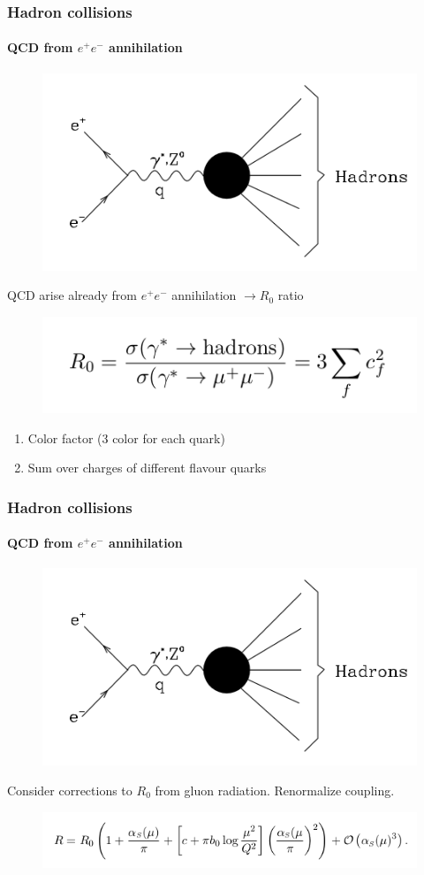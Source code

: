 \documentclass[aspectratio=43]{beamer}
\begin{document}
\begin{frame}

	\frametitle{Hadron collisions}
	\framesubtitle{QCD from $e^{+}e^{-}$ annihilation}

	\begin{figure}
		\includegraphics[width = 5 cm]{plots/ee_hadrons.png}
	\end{figure}
 
	QCD arise already from $e^{+}e^{-}$ annihilation $\rightarrow R_{0}$ ratio
	\begin{figure}
		\includegraphics[width = 6 cm]{plots/eq_R0.png}
	\end{figure}

	\begin{enumerate}
		\item Color factor (3 color for each quark)
		\item Sum over charges of different flavour quarks

	\end{enumerate}	
	
\end{frame}

\begin{frame}

	\frametitle{Hadron collisions}
	\framesubtitle{QCD from $e^{+}e^{-}$ annihilation}
	
	\begin{figure}
		\includegraphics[width = 5 cm]{plots/ee_hadrons.png}
	\end{figure}	
	
	Consider corrections to $R_{0}$ from gluon radiation. Renormalize coupling.
	\begin{figure}
		\includegraphics[width = 10 cm]{plots/eq_R0_3.png}
	\end{figure}

\end{frame}
\end{document}

